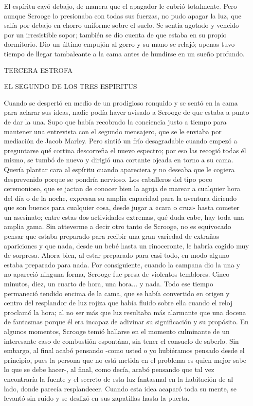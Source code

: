 \documentclass{novela}
\begin{document}
 El espíritu cayó debajo, de manera que el apagador le cubrió totalmente. Pero aunque Scrooge lo presionaba con todas sus fuerzas, no pudo apagar la luz, que salía por debajo en chorro uniforme sobre el suelo.
 Se sentía agotado y vencido por un irresistible sopor; también se dio cuenta de que estaba en su propio dormitorio. Dio un último empujón al gorro y su mano se relajó; apenas tuvo tiempo de llegar tambaleante a la cama antes de hundirse en un sueño profundo.


 TERCERA ESTROFA


 EL SEGUNDO DE LOS TRES ESPIRITUS


 Cuando se despertó en medio de un prodigioso ronquido y se sentó en la cama para aclarar sus ideas, nadie podía haver avisado a Scrooge de que estaba a punto de dar la una. Supo que había recobrado la conciencia justo a tiempo para mantener una entrevista con el segundo mensajero, que se le enviaba por mediación de Jacob Marley. Pero sintió un frío desagradable cuando empezó a preguntarse qué cortina descorrefia el nuevo espectro; por eso las recogió todas él mismo, se tumbó de nuevo y dirigió una cortante ojeada en torno a su cama. Quería plantar cara al espíritu cuando apareciera y no deseaba que le cogiera desprevenido porque se pondría nervioso.
 Los caballeros del tipo poco ceremonioso, que se jactan de conocer bien la aguja de marear a cualquier hora del día o de la noche, expresan su amplia capacidad para la aventura diciendo que son buenos para cualquier cosa, desde jugar a «cara o cruz» hasta cometer un asesinato; entre estas dos actividades extremas, qué duda cabe, hay toda una amplia gama. Sin atteverme a decir otro tanto de Scrooge, no es equivocado pensar que estaba preparado para recibir una gran variedad de extrañas apariciones y que nada, desde un bebé hasta un rinoceronte, le habría cogido muy de sorpresa.
 Ahora bien, al estar preparado para casi todo, en modo alguno estaba preparado para nada. Por consiguiente, cuando la campana dio la una y no apareció ninguna forma, Scrooge fue presa de violentos temblores. Cinco minutos, diez, un cuarto de hora, una hora... y nada. Todo ese tiempo permaneció tendido encima de la cama, que se había convertido en origen y centro del resplandor de luz rojiza que había fluido sobre ella cuando el reloj proclamó la hora; al no ser más que luz resultaba más alarmante que una docena de fantasmas porque él era incapaz de adivinar su significación y su propósito. En algunos momentos, Scrooge temió hallarse en el momento culminante de un interesante caso de combustión espontána, sin tener el consuelo de saberlo. Sin embargo, al final acabó pensando -como usted o yo hubiéramos pensado desde el principio, pues la persona que no está metida en el problema es quien mejor sabe lo que se debe hacer-, al final, como decía, acabó pensando que tal vez encontraría la fuente y el secreto de esta luz fantasmal en la habitación de al lado, donde parecía resplandecer. Cuando esta idea acaparó toda su mente, se levantó sin ruido y se deslizó en sus zapatillas hasta la puerta.
\end{document}
